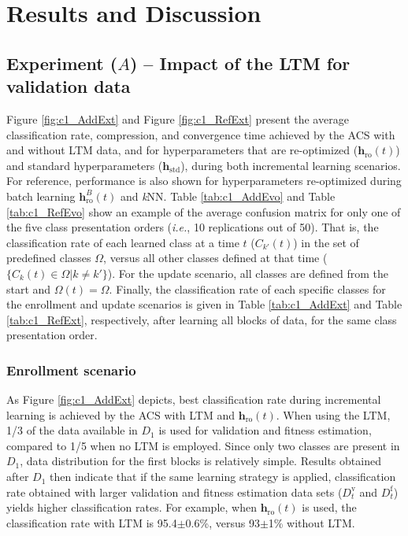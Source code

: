 \section{Results and Discussion}
\label{sec:c1_results_discussion}

\subsection{Experiment ($A$) -- Impact of the LTM for validation data}

Figure \ref{fig:c1_AddExt} and Figure \ref{fig:c1_RefExt} present the average classification rate, compression, and convergence time achieved by the ACS with and without LTM data, and for hyperparameters that are re-optimized ($\textbf{h}_\text{ro}(t)$) and standard hyperparameters ($\textbf{h}_\text{std}$), during both incremental learning scenarios. For reference, performance is also shown for hyperparameters re-optimized during batch learning $\textbf{h}_\text{ro}^B(t)$ and \textit{k}NN. Table \ref{tab:c1_AddEvo} and Table \ref{tab:c1_RefEvo} show an example of the average confusion matrix for only one of the five class presentation orders (\emph{i.e.}, 10 replications out of 50). That is, the classification rate of each learned class at a time $t$ ($C_{k'}(t)$) in the set of predefined classes $\Omega$, versus all other classes defined at that time ($\{C_k(t)\in \Omega|k\neq k'\}$). For the update scenario, all classes are defined from the start and $\Omega(t)=\Omega$. Finally, the classification rate of each specific classes for the enrollment and update scenarios is given in Table \ref{tab:c1_AddExt} and Table \ref{tab:c1_RefExt}, respectively, after learning all blocks of data, for the same class presentation order.

\subsubsection{Enrollment scenario}

As Figure \ref{fig:c1_AddExt} depicts, best classification rate during incremental learning is achieved by the ACS with LTM and $\textbf{h}_\text{ro}(t)$.
When using the LTM, 1/3 of the data available in $D_1$ is used for validation and fitness estimation, compared to 1/5 when no LTM is employed. Since only two classes are present in $D_1$, data distribution for the first blocks is relatively simple. Results obtained after $D_1$ then indicate that if the same learning strategy is applied, classification rate obtained with larger validation and fitness estimation data sets ($D_t^\text{v}$ and $D_t^\text{f}$) yields higher classification rates. For example, when $\textbf{h}_\text{ro}(t)$ is used, the classification rate with LTM is 95.4$\pm$0.6\%, versus 93$\pm$1\% without LTM.

